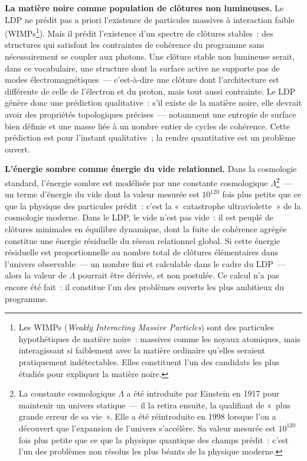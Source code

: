 \documentclass[12pt, a4paper, openright]{book}
\begin{document}
\textbf{La matière noire comme population de clôtures non lumineuses.} Le LDP ne prédit pas a priori l'existence de particules massives à interaction faible (WIMPs\footnote{Les WIMPs (\textit{Weakly Interacting Massive Particles}) sont des particules hypothétiques de matière noire~: massives comme les noyaux atomiques, mais interagissant si faiblement avec la matière ordinaire qu'elles seraient pratiquement indétectables. Elles constituent l'un des candidats les plus étudiés pour expliquer la matière noire.}). Mais il prédit l'existence d'un spectre de clôtures stables~: des structures qui satisfont les contraintes de cohérence du programme sans nécessairement se coupler aux photons. Une clôture stable non lumineuse serait, dans ce vocabulaire, une structure dont la surface active ne supporte pas de modes électromagnétiques~--- c'est-à-dire une clôture dont l'architecture est différente de celle de l'électron et du proton, mais tout aussi contrainte. Le LDP génère donc une prédiction qualitative~: s'il existe de la matière noire, elle devrait avoir des propriétés topologiques précises~--- notamment une entropie de surface bien définie et une masse liée à un nombre entier de cycles de cohérence. Cette prédiction est pour l'instant qualitative~; la rendre quantitative est un problème ouvert.

\medskip

\textbf{L'énergie sombre comme énergie du vide relationnel.} Dans la cosmologie standard, l'énergie sombre est modélisée par une constante cosmologique $\Lambda$\footnote{La constante cosmologique $\Lambda$ a été introduite par Einstein en 1917 pour maintenir un univers statique~--- il la retira ensuite, la qualifiant de «~plus grande erreur de sa vie~». Elle a été réintroduite en 1998 lorsque l'on a découvert que l'expansion de l'univers s'accélère. Sa valeur mesurée est $10^{120}$ fois plus petite que ce que la physique quantique des champs prédit~: c'est l'un des problèmes non résolus les plus béants de la physique moderne.}~--- un terme d'énergie du vide dont la valeur mesurée est $10^{120}$ fois plus petite que ce que la physique des particules prédit~: c'est la «~catastrophe ultraviolette~» de la cosmologie moderne. Dans le LDP, le vide n'est pas vide~: il est peuplé de clôtures minimales en équilibre dynamique, dont la fuite de cohérence agrégée constitue une énergie résiduelle du réseau relationnel global. Si cette énergie résiduelle est proportionnelle au nombre total de clôtures élémentaires dans l'univers observable~--- un nombre fini et calculable dans le cadre du LDP~--- alors la valeur de $\Lambda$ pourrait être dérivée, et non postulée. Ce calcul n'a pas encore été fait~: il constitue l'un des problèmes ouverts les plus ambitieux du programme.
\end{document}
